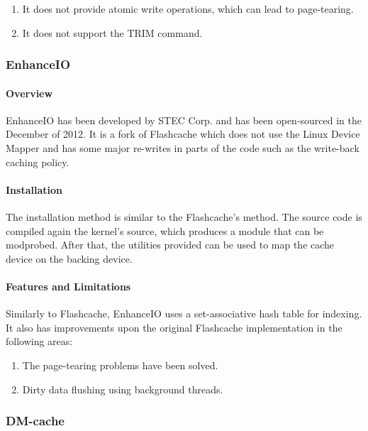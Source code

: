 \begin{enumerate}
	\item It does not provide atomic write operations, which can lead to 
		page-tearing.
	\item It does not support the TRΙΜ command.
\end{enumerate}

\subsubsection{EnhanceIO}

\paragraph{Overview}

EnhanceIO has been developed by STEC Corp. and has been open-sourced in the 
December of 2012. It is a fork of Flashcache which does not use the Linux 
Device Mapper and has some major re-writes in parts of the code such as the 
write-back caching policy.

\paragraph{Installation}

The installation method is similar to the Flashcache's method. The source code 
is compiled again the kernel's source, which produces a module that can be 
modprobed. After that, the utilities provided can be used to map the cache 
device on the backing device.

\paragraph{Features and Limitations}

Similarly to Flashcache, EnhanceIO uses a set-associative hash table for 
indexing. It also has improvements upon the original Flashcache implementation 
in the following areas:

\begin{enumerate}
	\item The page-tearing problems have been solved.
	\item Dirty data flushing using background threads.
\end{enumerate}

\subsubsection{DM-cache}

